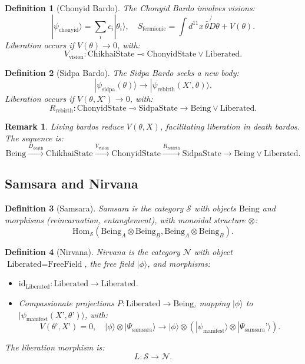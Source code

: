 \documentclass{article}
\newtheorem{definition}{Definition}
\newtheorem{remark}{Remark}
\begin{document}
\begin{definition}[Chonyid Bardo]
\label{def:chonyid-bardo}
The Chonyid Bardo involves visions:
\[
|\psi_{\text{chonyid}}\rangle = \sum_i c_i |\theta_i\rangle, \quad S_{\text{fermionic}} = \int d^{11}x \, \bar{\theta} \not{D} \theta + V(\theta).
\]
Liberation occurs if \( V(\theta) \to 0 \), with:
\[
V_{\text{vision}} : \text{ChikhaiState} \multimap \text{ChonyidState} \lor \text{Liberated}.
\]
\end{definition}

\begin{definition}[Sidpa Bardo]
\label{def:sidpa-bardo}
The Sidpa Bardo seeks a new body:
\[
|\psi_{\text{sidpa}}(\theta)\rangle \to |\psi_{\text{rebirth}}(X’, \theta)\rangle.
\]
Liberation occurs if \( V(\theta, X’) \to 0 \), with:
\[
R_{\text{rebirth}} : \text{ChonyidState} \multimap \text{SidpaState} \to \text{Being} \lor \text{Liberated}.
\]
\end{definition}

\begin{remark}
Living bardos reduce \( V(\theta, X) \), facilitating liberation in death bardos. The sequence is:
\[
\text{Being} \xrightarrow{D_{\text{death}}} \text{ChikhaiState} \xrightarrow{V_{\text{vision}}} \text{ChonyidState} \xrightarrow{R_{\text{rebirth}}} \text{SidpaState} \to \text{Being} \lor \text{Liberated}.
\]
\end{remark}

\subsection{Samsara and Nirvana}
\label{sec:samsara-nirvana}

\begin{definition}[Samsara]
\label{def:samsara}
Samsara is the category \( \mathcal{S} \) with objects \( \text{Being} \) and morphisms (reincarnation, entanglement), with monoidal structure \( \otimes \):
\[
\text{Hom}_{\mathcal{S}}(\text{Being}_A \otimes \text{Being}_B, \text{Being}_A \otimes \text{Being}_B).
\]
\end{definition}

\begin{definition}[Nirvana]
\label{def:nirvana}
Nirvana is the category \( \mathcal{N} \) with object \( \text{Liberated} = \text{FreeField} \), the free field \( |\phi\rangle \), and morphisms:
\begin{itemize}
    \item \( \text{id}_{\text{Liberated}} : \text{Liberated} \to \text{Liberated} \).
    \item Compassionate projections \( P: \text{Liberated} \to \text{Being} \), mapping \( |\phi\rangle \) to \( |\psi_{\text{manifest}}(X’, \theta’)\rangle \), with:
    \[
    V(\theta’, X’) = 0, \quad |\phi\rangle \otimes |\Psi_{\text{samsara}}\rangle \to |\phi\rangle \otimes (|\psi_{\text{manifest}}\rangle \otimes |\Psi_{\text{samsara}}’\rangle).
    \]
\end{itemize}
The liberation morphism is:
\[
L: \mathcal{S} \to \mathcal{N}.
\]
\end{definition}
\end{document}
